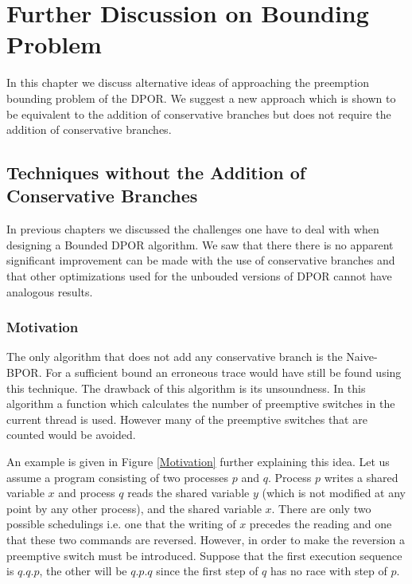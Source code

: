 \chapter{Further Discussion on Bounding Problem}
\label{Chapter 5}

In this chapter we discuss alternative ideas of approaching the preemption bounding problem of the DPOR. 
We suggest a new approach which is shown to be equivalent to the addition of conservative branches but does not require the addition of conservative
branches.

\section{Techniques without the Addition of Conservative Branches}

In previous chapters we discussed the challenges one have to deal with when designing a Bounded DPOR algorithm. We saw that there there is 
no apparent significant improvement can be made with the use of conservative branches and that other optimizations used for the unbouded versions of DPOR
cannot have analogous results. 

\subsection{Motivation}
The only algorithm that does not add any conservative branch is the Naive-BPOR. For a sufficient bound an erroneous trace would have still be found using this technique.
The drawback of this algorithm is its unsoundness. In this algorithm a function which calculates the number of preemptive switches in the current thread is used.
However many of the preemptive switches that are counted would be avoided.

An example is given in Figure \ref{Motivation} further explaining this idea. Let us assume a program consisting of two processes $p$ and $q$. 
Process $p$ writes a shared variable $x$ and process $q$ reads the shared variable $y$ (which is not modified at any point by any other process), 
and the shared variable $x$. There are only two possible schedulings i.e. one that the writing of $x$ precedes the reading and one that these two
commands are reversed. However, in order to make the reversion a preemptive switch must be introduced. Suppose that the first execution sequence is 
$q.q.p$, the other will be $q.p.q$ since the first step of $q$ has no race with step of $p$.


